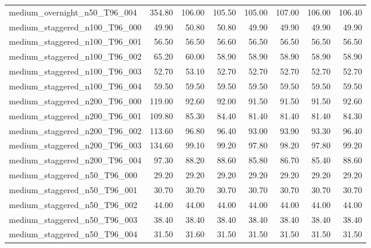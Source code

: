 \begin{table}[htbp]
\begin{tabular}{lrrrrrrr}
medium\_overnight\_n50\_T96\_004 & 354.80 & 106.00 & 105.50 & 105.00 & 107.00 & 106.00 & 106.40 \\
medium\_staggered\_n100\_T96\_000 & 49.90 & 50.80 & 50.80 & 49.90 & 49.90 & 49.90 & 49.90 \\
medium\_staggered\_n100\_T96\_001 & 56.50 & 56.50 & 56.60 & 56.50 & 56.50 & 56.50 & 56.50 \\
medium\_staggered\_n100\_T96\_002 & 65.20 & 60.00 & 58.90 & 58.90 & 58.90 & 58.90 & 58.90 \\
medium\_staggered\_n100\_T96\_003 & 52.70 & 53.10 & 52.70 & 52.70 & 52.70 & 52.70 & 52.70 \\
medium\_staggered\_n100\_T96\_004 & 59.50 & 59.50 & 59.50 & 59.50 & 59.50 & 59.50 & 59.50 \\
medium\_staggered\_n200\_T96\_000 & 119.00 & 92.60 & 92.00 & 91.50 & 91.50 & 91.50 & 92.60 \\
medium\_staggered\_n200\_T96\_001 & 109.80 & 85.30 & 84.40 & 81.40 & 81.40 & 81.40 & 84.30 \\
medium\_staggered\_n200\_T96\_002 & 113.60 & 96.80 & 96.40 & 93.00 & 93.90 & 93.30 & 96.40 \\
medium\_staggered\_n200\_T96\_003 & 134.60 & 99.10 & 99.20 & 97.80 & 98.20 & 97.80 & 99.20 \\
medium\_staggered\_n200\_T96\_004 & 97.30 & 88.20 & 88.60 & 85.80 & 86.70 & 85.40 & 88.60 \\
medium\_staggered\_n50\_T96\_000 & 29.20 & 29.20 & 29.20 & 29.20 & 29.20 & 29.20 & 29.20 \\
medium\_staggered\_n50\_T96\_001 & 30.70 & 30.70 & 30.70 & 30.70 & 30.70 & 30.70 & 30.70 \\
medium\_staggered\_n50\_T96\_002 & 44.00 & 44.00 & 44.00 & 44.00 & 44.00 & 44.00 & 44.00 \\
medium\_staggered\_n50\_T96\_003 & 38.40 & 38.40 & 38.40 & 38.40 & 38.40 & 38.40 & 38.40 \\
medium\_staggered\_n50\_T96\_004 & 31.50 & 31.60 & 31.50 & 31.50 & 31.50 & 31.50 & 31.50 \\
\bottomrule
\end{tabular}
\end{table}
